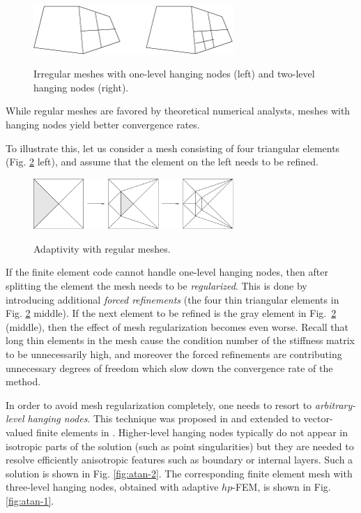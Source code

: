 \documentclass[final,3p,times,twocolumn]{elsarticle}
\begin{document}
\begin{figure}[!htb]
\begin{center}
 {
\includegraphics[width=7.6cm]{hang.pdf}
}
\end{center}
\vspace{-5mm}
\caption{Irregular meshes with one-level hanging nodes (left)
         and two-level hanging nodes (right).}
\label{fig:hang}
\end{figure}

While regular meshes are favored by theoretical
numerical analysts, meshes with hanging nodes 
yield better convergence rates. 

To illustrate this, let us consider a mesh 
consisting of four triangular 
elements (Fig. \ref{fig:hang-2} left), and 
assume that the element on the left needs to be 
refined. 

\begin{figure}[!htb]
\begin{center}
 {
\includegraphics[width=7.6cm]{hang-2.pdf}
}
\end{center}
\vspace{-5mm}
\caption{Adaptivity with regular meshes.}
\label{fig:hang-2}
\end{figure}

If the finite element code cannot handle one-level hanging nodes,
then after splitting the element the mesh needs to be
{\em regularized}. This is done by introducing 
additional {\em forced refinements} (the four thin triangular
elements in Fig. \ref{fig:hang-2} middle). If the next 
element to be refined is the gray element in Fig.~\ref{fig:hang-2}
(middle), then the effect of mesh regularization becomes even 
worse. Recall that long thin elements in the mesh cause 
the condition number of the stiffness matrix to be unnecessarily 
high, and moreover the forced refinements are contributing unnecessary 
degrees of freedom which slow down the convergence rate of the method.


In order to avoid mesh regularization completely, one needs to resort to 
{\em arbitrary-level hanging nodes}. This technique was proposed in 
\cite{hangno-1} and extended to vector-valued finite elements in \cite{hangno-2}.
Higher-level hanging nodes typically do not appear in isotropic parts 
of the solution (such as point singularities) but they are needed to
resolve efficiently anisotropic features such as boundary or internal
layers. Such a solution
is shown in Fig. \ref{fig:atan-2}. The corresponding finite element mesh with 
three-level hanging nodes, obtained with adaptive $hp$-FEM, is shown in 
Fig. \ref{fig:atan-1}.
\end{document}
